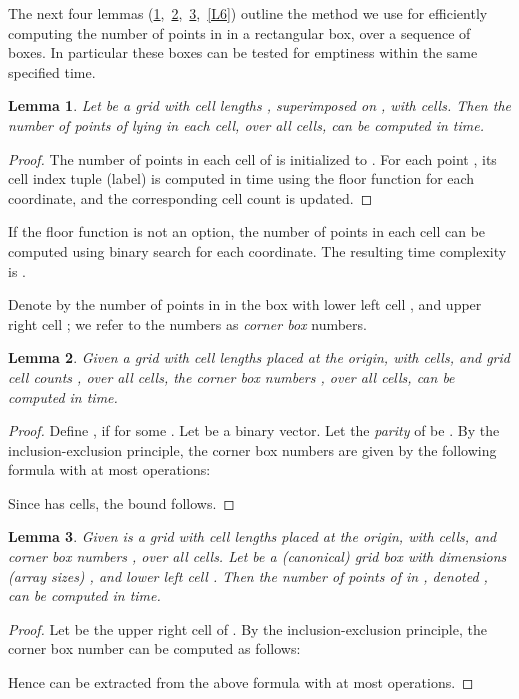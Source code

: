 \documentclass[11pt]{article}
\newtheorem{lemma}{Lemma}
\begin{document}
The next four lemmas (\ref{L3},~\ref{L4},~\ref{L5},~\ref{L6})
outline the method we use for efficiently computing the 
number of points in  in a rectangular box, over a sequence 
of boxes. In particular these boxes can be tested for emptiness within
the same specified time. 

\begin{lemma} \label{L3}
Let  be a grid with cell lengths , 
superimposed on , with  cells.
Then the number of points of  lying in each cell, over all cells,
can be computed in  time. 
\end{lemma}
\begin{proof}
The number of points in each cell of  is initialized to . 
For each point , its cell index tuple (label) is computed
in  time using the floor function for each coordinate, 
and the corresponding cell count is updated. 
\end{proof}

 If the floor function is not an option,
the number of points in each cell can be computed using binary search 
for each coordinate. The resulting time complexity is
. 

\medskip
Denote by  the number of points in  in the
box with lower left cell , and upper right cell
; we refer to the numbers  
as {\em corner box} numbers. 


\begin{lemma} \label{L4}
Given a grid  with cell lengths  placed at the origin, 
with  cells, and grid cell counts ,  over all
cells, the corner box numbers , over all cells,
can be computed in  time.  
\end{lemma}
\begin{proof}
Define , if  for some . 
Let  be a binary vector.
Let the {\em parity} of  be 
. 
By the inclusion-exclusion principle, the corner box numbers
are given by the following formula with at most  operations:

Since  has  cells, the bound follows.
\end{proof}


\begin{lemma} \label{L5}
Given is a grid  with cell lengths  placed at the origin, 
with  cells, and corner box numbers ,
over all cells. Let  be a (canonical) grid box with dimensions
(array sizes) , and lower left cell
. Then the number of points of  in ,
denoted , can be computed in  time. 
\end{lemma}
\begin{proof}
Let  be the upper right cell of
. By the inclusion-exclusion principle, the corner box number
 can be computed as follows:

Hence  can be extracted from the above formula with at most 
operations. 
\end{proof}
\end{document}
